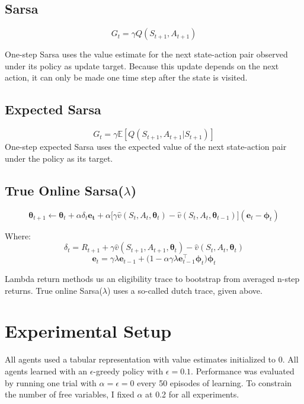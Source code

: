 \documentclass{article}
\begin{document}
\subsection{Sarsa}
	$$G_t = \gamma Q(S_{t+1}, A_{t+1})$$

	One-step Sarsa uses the value estimate for the next state-action pair observed under its policy as update target. Because this update depends on the next action, it can only be made one time step after the state is visited.

\subsection{Expected Sarsa}
	$$G_t = \gamma \mathbb{E}[Q(S_{t+1}, A_{t+1} | S_{t+1})]$$
	One-step expected Sarsa uses the expected value of the next state-action pair under the policy as its target.

\subsection{True Online Sarsa($\lambda$)}

	$$\bm{\theta}_{t+1} \leftarrow \bm{\theta}_t + \alpha\delta_t\bm{e_t} + \alpha\big[ \gamma \hat v(S_{t}, A_{t}, \bm{\theta}_t) - \hat  v(S_{t}, A_{t}, \bm{\theta}_{t-1})\big](\bm{ e}_t - \bm{\phi}_t)$$

    Where:
$$\delta_t = R_{t+1} + \gamma \hat v(S_{t+1}, A_{t+1},\bm{\theta}_t) - \hat v(S_t, A_t, \bm{\theta}_t)$$
$$\bm{e}_t = \gamma \lambda \bm{e}_{t-1} + \big(1 - \alpha \gamma \lambda \bm{e}_{t-1} ^\top \bm{\phi}_t \big) \bm{\phi}_t$$

    Lambda return methods us an eligibility trace to bootstrap from averaged n-step returns. True online Sarsa($\lambda$) uses a so-called dutch trace, given above.




	\section{Experimental Setup}

	All agents used a tabular representation with value estimates initialized to 0. All agents learned with an $\epsilon$-greedy policy with $\epsilon=0.1$. Performance was evaluated by running one trial with $\alpha = \epsilon = 0$ every 50 episodes of learning. To constrain the number of free variables, I fixed $\alpha$ at 0.2 for all experiments.
\end{document}
